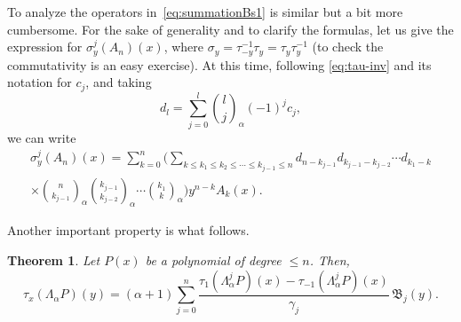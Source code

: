 \documentclass[10pt]{article}
\theoremstyle{plain}
\newtheorem{theorem}{Theorem}[section]
\theoremstyle{definition}
\numberwithin{equation}{section} %
\newcommand{\La}{\Lambda_{\alpha}}
\newcommand{\binoma}[2]{\binom{#1}{#2}_{\!\alpha}}
\newcommand{\B}{\mathfrak{B}}
\newcommand{\cc}{\gamma}
\begin{document}
To analyze the operators in~\eqref{eq:summationBs1} is similar but a bit more cumbersome. 
For the sake of generality and to clarify the formulas, let us give the expression for 
$\sigma_y^j(A_n)(x)$, where $\sigma_y = \tau_{-y}^{-1}\tau_{y} = \tau_{y}\tau_{y}^{-1}$ 
(to check the commutativity is an easy exercise). At this time, following \eqref{eq:tau-inv} 
and its notation for $c_j$, and taking
\[
  d_l = \sum_{j=0}^l \binoma{l}{j} (-1)^j c_j,
\]
we can write
\begin{multline*}
  \sigma_y^j(A_n)(x) 
  = \sum_{k=0}^n \Bigg( \sum_{k \le k_1 \le k_2 \le \cdots \le k_{j-1} \le n} 
  d_{n-k_{j-1}}d_{k_{j-1}-k_{j-2}}\cdots d_{k_{1}-k} \\
  \times \binoma{n}{k_{j-1}} \binoma{k_{j-1}}{k_{j-2}} 
  \cdots \binoma{k_1}{k} \Bigg) y^{n-k}A_{k}(x).
\end{multline*} 

Another important property is what follows.

\begin{theorem}
\label{teo:tauLaP}
Let $P(x)$ be a polynomial of degree $\le n$. Then,
\begin{equation}
\label{eq:tauLaP}
  \tau_x (\La P)(y) = (\alpha+1) \sum_{j=0}^{n} \frac{\tau_1(\La^j P)(x) - \tau_{-1} (\La^j P)(x)}{\cc_j} \, \B_j(y).
\end{equation}
\end{theorem}
\end{document}
